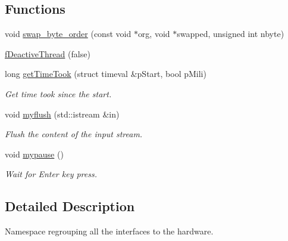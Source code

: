 \subsection*{Functions}
\begin{DoxyCompactItemize}
\item 
void \hyperlink{namespace_ph2___hw_interface_ad58bc815dfbb93c57791f3aecc84a1ea}{swap\-\_\-byte\-\_\-order} (const void $\ast$org, void $\ast$swapped, unsigned int nbyte)
\item 
\hyperlink{namespace_ph2___hw_interface_a45c84dee08a5b37d565bbcd5eeab2b4d}{f\-Deactive\-Thread} (false)
\item 
long \hyperlink{namespace_ph2___hw_interface_a033a07cbe28368de19d534ef7cd3325d}{get\-Time\-Took} (struct timeval \&p\-Start, bool p\-Mili)
\begin{DoxyCompactList}\small\item\em Get time took since the start. \end{DoxyCompactList}\item 
void \hyperlink{namespace_ph2___hw_interface_a2fe2ee1ddb69c79c23bf9b0b2fa58f67}{myflush} (std\-::istream \&in)
\begin{DoxyCompactList}\small\item\em Flush the content of the input stream. \end{DoxyCompactList}\item 
void \hyperlink{namespace_ph2___hw_interface_a20399ed909de2641f1e7e086a4ec3667}{mypause} ()
\begin{DoxyCompactList}\small\item\em Wait for Enter key press. \end{DoxyCompactList}\end{DoxyCompactItemize}


\subsection{Detailed Description}
Namespace regrouping all the interfaces to the hardware. 

